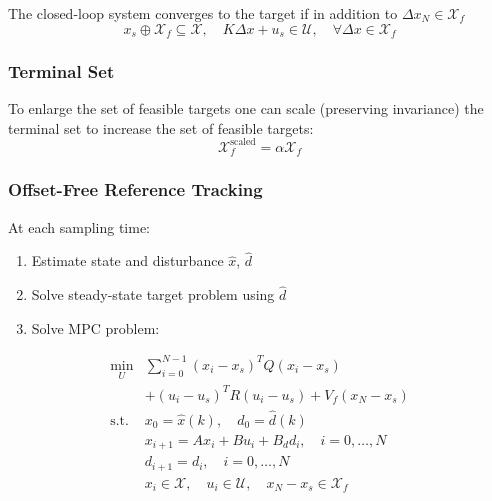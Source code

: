 
The closed-loop system converges to the target if in addition to $\Delta x_N \in \mathcal{X}_f$
\begin{equation*}
    x_s \oplus \mathcal{X}_f \subseteq \mathcal{X}, \quad K\Delta x + u_s \in \mathcal{U}, \quad \forall \Delta x \in \mathcal{X}_f
\end{equation*}

\subsubsection{Terminal Set}

To enlarge the set of feasible targets one can scale (preserving invariance) the terminal set to increase the set of feasible targets:
\begin{equation*}
    \mathcal{X}_f^{\text{scaled}} = \alpha \mathcal{X}_f
\end{equation*}

\subsubsection{Offset-Free Reference Tracking}

At each sampling time:
\begin{enumerate}
    \item Estimate state and disturbance $\widehat{x}$, $\widehat{d}$
    \item Solve steady-state target problem using $\widehat{d}$
    \item Solve MPC problem:
\end{enumerate}
\noindent
\begin{align*}
    \min_U       & \sum_{i=0}^{N-1} {(x_i - x_s)}^T Q (x_i - x_s)                                    \\
                 & + {(u_i - u_s)}^T R (u_i - u_s) + V_f(x_N - x_s)                                  \\
    \text{s.t. } & x_0 = \widehat{x}(k), \quad d_0 = \widehat{d}(k)                                  \\
                 & x_{i+1} = Ax_i + Bu_i + B_d d_i, \quad i = 0, \dots, N                            \\
                 & d_{i+1} = d_i, \quad i = 0, \dots, N                                              \\
                 & x_i \in \mathcal{X}, \quad u_i \in \mathcal{U}, \quad x_N - x_s \in \mathcal{X}_f
\end{align*}

